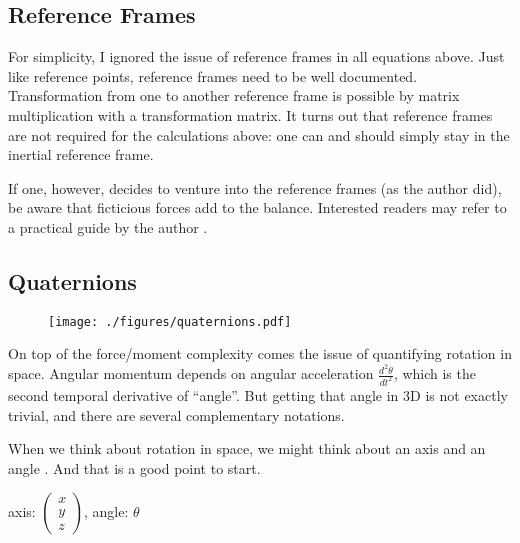 \subsection{Reference Frames}
\label{sec:org2398887}

For simplicity, I ignored the issue of reference frames in all equations above.
Just like reference points, reference frames need to be well documented.
Transformation from one to another reference frame is possible by matrix multiplication with a transformation matrix.
It turns out that reference frames are not required for the calculations above: one can and should simply stay in the inertial reference frame.

If one, however, decides to venture into the reference frames (as the author did), be aware that ficticious forces add to the balance.
Interested readers may refer to a practical guide by the author \citep{Mielke2020wrenches}.


\subsection{Quaternions}
\label{sec:orge2ef322}
\begin{figure}[b]
\centering
\texttt{[image: ./figures/quaternions.pdf]}
\caption{\label{fig:quaternion}}
\end{figure}

On top of the force/moment complexity comes the issue of quantifying rotation in space.
Angular momentum depends on angular acceleration \(\frac{d^2\theta}{dt^2}\), which is the second temporal derivative of ``angle''.
But getting that angle in 3D is not exactly trivial, and there are several complementary notations.


When we think about rotation in space, we might think about an axis and an angle .
And that is a good point to start.

\begin{center}
axis: \(\begin{pmatrix}x\\y\\z \end{pmatrix}\), angle: \(\theta\)
\end{center}

